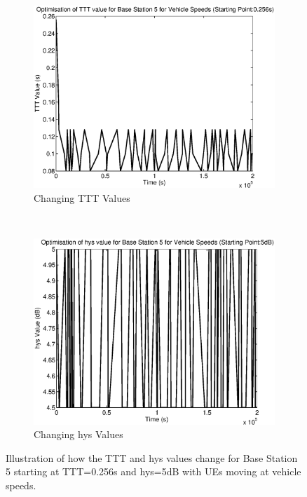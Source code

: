 \begin{figure}[H]
        \centering
        \begin{subfigure}[b]{0.49\textwidth}
                \includegraphics[width=\textwidth]{figures/graphs/vehmid/TTT5.eps}
                \caption{Changing TTT Values}
        \end{subfigure}%
        ~ %
        \begin{subfigure}[b]{0.49\textwidth}
                \includegraphics[width=\textwidth]{figures/graphs/vehmid/hys5.eps}
                \caption{Changing hys Values}
        \end{subfigure}
        \caption{Illustration of how the TTT and hys values change for Base Station 5 starting at TTT=0.256s and hys=5dB with UEs moving at vehicle speeds.}
\end{figure}
